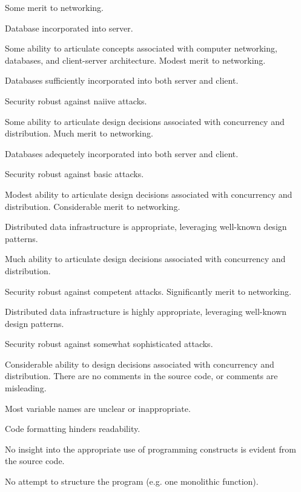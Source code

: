 \documentclass{../../fal_assignment}
\begin{document}
\begin{markingrubric}
        \grade Some merit to networking.
            \par Database incorporated into server.
            \par Some ability to articulate concepts associated with computer networking, databases, and client-server architecture.
        \grade Modest merit to networking.
            \par Databases sufficiently incorporated into both server and client.
            \par Security robust against naiive attacks.
            \par Some ability to articulate design decisions associated with concurrency and distribution.
        \grade Much merit to networking.
            \par Databases adequetely incorporated into both server and client.
            \par Security robust against basic attacks.
            \par Modest ability to articulate design decisions associated with concurrency and distribution.
        \grade Considerable merit to networking.
            \par Distributed data infrastructure is appropriate, leveraging well-known design patterns.
            \par Much ability to articulate design decisions associated with concurrency and distribution.
            \par Security robust against competent attacks.
        \grade Significantly merit to networking.
            \par Distributed data infrastructure is highly appropriate, leveraging well-known design patterns.
            \par Security robust against somewhat sophisticated attacks.
            \par Considerable ability to design decisions associated with concurrency and distribution.
%
        \grade\fail There are no comments in the source code, or comments are misleading.
            \par Most variable names are unclear or inappropriate.
            \par Code formatting hinders readability.
            \par No insight into the appropriate use of programming constructs is evident from the source code.
            \par No attempt to structure the program (e.g. one monolithic function).

\end{markingrubric}
\end{document}
